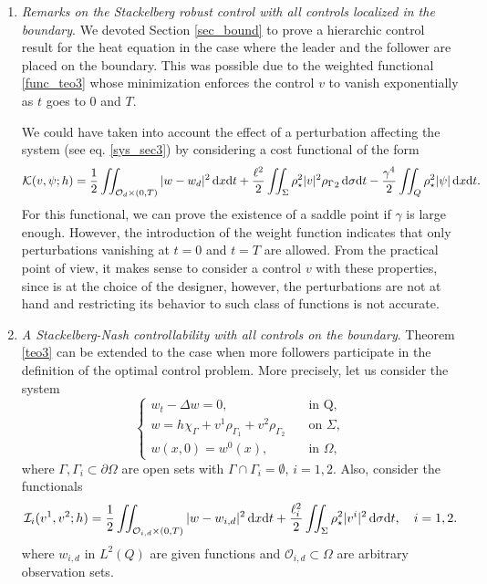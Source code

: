 \documentclass[preprint,10pt]{article}
\numberwithin{equation}{section}
\numberwithin{theorem}{section}
\def\dx{\,\textnormal{d}x}
\def\dt{\textnormal{d}t}
\def\d{\,\textnormal{d}}
\def\cbd{\Gamma}
\def\csbd{\rho_{\Gamma}}
\def\dx{\,\textnormal{d}x}
\def\dt{\textnormal{d}t}
\def\d{\,\textnormal{d}}
\begin{document}
{\begin{enumerate}
\item \textit{Remarks on the Stackelberg robust control with all controls localized in the boundary}. We devoted Section \ref{sec_bound} to prove a hierarchic control result for the heat equation in the case where the leader and the follower are placed on the boundary. This was possible due to the weighted functional \eqref{func_teo3} whose minimization enforces the control $v$ to vanish exponentially as $t$ goes to $0$ and $T$. 

We could have taken into account the effect of a perturbation affecting the system (see eq. \eqref{sys_sec3}) by considering a cost functional of the form
%
\begin{equation*}
\mathcal K(v,\psi;h)=\frac{1}{2}\iint_{\mathcal O_d\times(0,T)}|w-w_d|^2\dx\dt+\frac{\ell^2}{2}\iint_{\Sigma}\rho_\star^2|v|^2{\csbd}_2\d\sigma\dt-\frac{\gamma^4}{2}\iint_{Q}\rho_\star^2|\psi|\dx\dt.
\end{equation*}
%
For this functional, we can prove the existence of a saddle point if $\gamma$ is large enough. However, the introduction of the weight function indicates that only perturbations vanishing at $t=0$ and $t=T$ are allowed. From the practical point of view, it makes sense to consider a control $v$ with these properties, since is at the choice of the designer, however, the perturbations are not at hand and restricting its behavior to such class of functions is not accurate.

\item \textit{A Stackelberg-Nash controllability with all controls on the boundary}. Theorem \ref{teo3} can be extended to the case when more followers participate in the definition of the optimal control problem. More precisely, let us consider the system
%
\begin{equation}\label{sys_sec3}
\begin{cases}
w_t-\Delta w=0, & \quad \text{in Q}, \\
w=h\chi_{\cbd}+ v^1\rho_{\Gamma_1}+v^2\rho_{\Gamma_2}&\quad \text{on } \Sigma, \\
w(x,0)=w^0(x), &\quad \text{in } \Omega,
\end{cases}
\end{equation}
% 
where $\Gamma,\Gamma_i\subset \partial \Omega$ are open sets with $\Gamma\cap\Gamma_i=\emptyset$, $i=1,2$. Also, consider the functionals
%
\begin{equation}\label{func_nash}
\mathcal I_i(v^1,v^2;h)=\frac{1}{2}\iint_{\mathcal O_{i,d}\times(0,T)}|w-w_{i,d}|^2\dx\dt+\frac{\ell_i^2}{2}\iint_{\Sigma}\rho_\star^2|v^{i}|^2\d\sigma\dt, \quad i=1,2.
\end{equation}
%
where $w_{i,d}$ in $L^2(Q)$ are given functions and $\mathcal{O}_{i,d}\subset \Omega$ are arbitrary observation sets.


\end{enumerate}}
\end{document}
